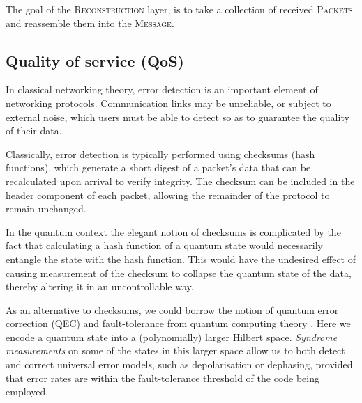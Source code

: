 \documentclass[aps, rmp, twocolumn, amsmath, amssymb, nofootinbib, superscriptaddress, longbibliography, floatfix, table-of-contents, eqsecnum]{revtex4-1}
\begin{document}
\begin{table}[!htb]
\caption{The goal of the \textsc{Reconstruction} layer, is to take a collection of received \textsc{Packets} and reassemble them into the \textsc{Message}.} \label{alg:reconstruction}
\end{table}

%
%

\subsection{Quality of service (QoS)} \label{sec:QOS} 

In classical networking theory, error detection is an important element of networking protocols. Communication links may be unreliable, or subject to external noise, which users must be able to detect so as to guarantee the quality of their data.

Classically, error detection is typically performed using checksums (hash functions), which generate a short digest of a packet's data that can be recalculated upon arrival to verify integrity. The checksum can be included in the header component of each packet, allowing the remainder of the protocol to remain unchanged.

In the quantum context the elegant notion of checksums is complicated by the fact that calculating a hash function of a quantum state would necessarily entangle the state with the hash function. This would have the undesired effect of causing measurement of the checksum to collapse the quantum state of the data, thereby altering it in an uncontrollable way.

As an alternative to checksums, we could borrow the notion of quantum error correction (QEC) and fault-tolerance from quantum computing theory \cite{???}. Here we encode a quantum state into a (polynomially) larger Hilbert space. \textit{Syndrome measurements} on some of the states in this larger space allow us to both detect and correct universal error models, such as depolarisation or dephasing, provided that error rates are within the fault-tolerance threshold of the code being employed.
\end{document}

